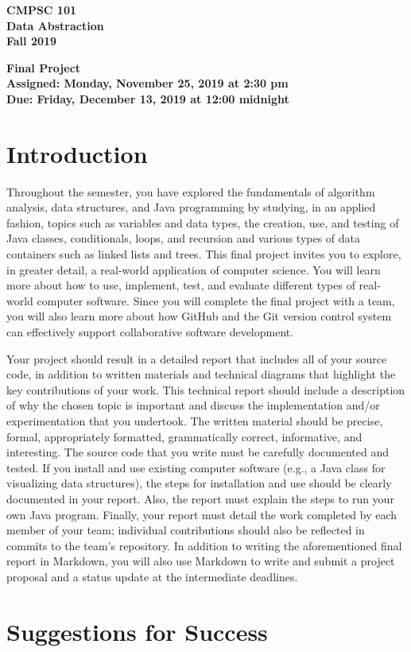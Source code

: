 \documentclass[11pt]{article}
\newcommand{\assignmentduedate}{December 13}
\newcommand{\assignmentassignedate}{November 25}
\newcommand{\labyear}{2019}
\newcommand{\labday}{Monday}
\newcommand{\labdueday}{Friday}
\newcommand{\labtime}{2:30 pm}
\newcommand{\labduetime}{12:00 midnight}
\newcommand{\assigneddate}{Assigned: \labday, \assignmentassignedate, \labyear{} at \labtime{}}
\newcommand{\duedate}{Due: \labdueday, \assignmentduedate, \labyear{} at \labduetime{}}
\newcommand{\labtitle}[1]
{
  \begin{center}
    \begin{center}
      \bf
      CMPSC 101\\Data Abstraction\\
      Fall 2019\\
      \medskip
    \end{center}
    \bf
    #1
  \end{center}
}
\begin{document}
\thispagestyle{empty}

\labtitle{Final Project \\ \assigneddate{} \\ \duedate{}}

\section*{Introduction}

Throughout the semester, you have explored the fundamentals of algorithm
analysis, data structures, and Java programming by studying, in an applied
fashion, topics such as variables and data types, the creation, use, and testing
of Java classes, conditionals, loops, and recursion and various types of data
containers such as linked lists and trees. This final project invites you to
explore, in greater detail, a real-world application of computer science. You
will learn more about how to use, implement, test, and evaluate different types
of real-world computer software. Since you will complete the final project with
a team, you will also learn more about how GitHub and the Git version control
system can effectively support collaborative software development.

Your project should result in a detailed report that includes all of your source
code, in addition to written materials and technical diagrams that highlight the
key contributions of your work. This technical report should include a
description of why the chosen topic is important and discuss the implementation
and/or experimentation that you undertook. The written material should be
precise, formal, appropriately formatted, grammatically correct, informative,
and interesting. The source code that you write must be carefully documented and
tested. If you install and use existing computer software (e.g., a Java class
for visualizing data structures), the steps for installation and use should be
clearly documented in your report. Also, the report must explain the steps to
run your own Java program. Finally, your report must detail the work completed
by each member of your team; individual contributions should also be reflected
in commits to the team's repository. In addition to writing the aforementioned
final report in Markdown, you will also use Markdown to write and submit a
project proposal and a status update at the intermediate deadlines.

\section*{Suggestions for Success}
\end{document}
